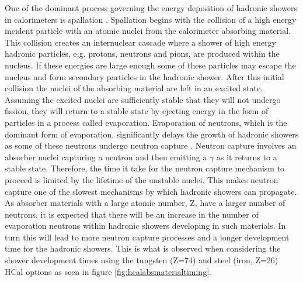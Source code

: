 One of the dominant process governing the energy deposition of hadronic showers in calorimeters is spallation \cite{Wigmans:2000vf}.  Spallation begins with the collision of a high energy incident particle with an atomic nuclei from the calorimeter absorbing material.  This collision creates an internuclear cascade where a shower of high energy hadronic particles, e.g. protons, neutrons and pions, are produced within the nucleus.  If these energies are large enough some of these particles may escape the nucleus and form secondary particles in the hadronic shower.  After this initial collision the nuclei of the absorbing material are left in an excited state.  Assuming the excited nuclei are sufficiently stable that they will not undergo fission, they will return to a stable state by ejecting energy in the form of particles in a process called evaporation.  Evaporation of neutrons, which is the dominant form of evaporation, significantly delays the growth of hadronic showers as some of these neutrons undergo neutron capture \cite{Adloff:2014rya}.  Neutron capture involves an absorber nuclei capturing a neutron and then emitting a $\gamma$ as it returns to a stable state.  Therefore, the time it take for the neutron capture mechanism to proceed is limited by the lifetime of the unstable nuclei.  This makes neutron capture one of the slowest mechanisms by which hadronic showers can propagate.  As absorber materials with a large atomic number, Z, have a larger number of neutrons, it is expected that there will be an increase in the number of evaporation neutrons within hadronic showers developing in such materials.  In turn this will lead to more neutron capture processes and a longer development time for the hadronic showers.  This is what is observed when considering the shower development times using the tungsten (Z=74) and steel (iron, Z=26) HCal options as seen in figure \ref{fig:hcalabsmaterialtiming}. 


